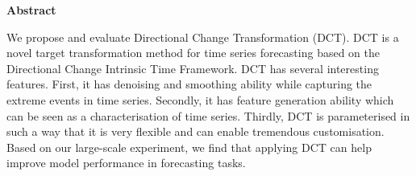 \begin{center}

    \vspace*{2cm}

    {\textbf{Abstract}}

    \vspace*{1cm}

\end{center}

\begin{doublespace}
    We propose and evaluate Directional Change Transformation (DCT). DCT is a novel target transformation method for time series forecasting based on the Directional Change Intrinsic Time Framework. DCT has several interesting features. First, it has denoising and smoothing ability while capturing the extreme events in time series. Secondly, it has feature generation ability which can be seen as a characterisation of time series. Thirdly, DCT is parameterised in such a way that it is very flexible and can enable tremendous customisation. Based on our large-scale experiment, we find that applying DCT can help improve model performance in forecasting tasks.
\end{doublespace}

\newpage
